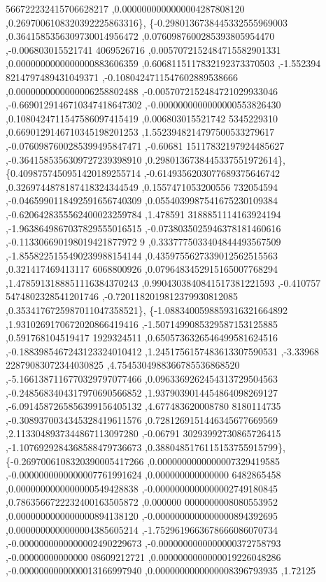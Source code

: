 \begin{DoxyCode}
      566722232415706628217 ,0.0000000000000004287808120 ,0.2697006108320392225863316\},
\{-0.2980136738445332555969003 ,0.3641585356309730014956472 ,0.0760987600285393805954470 ,-0.006803015521741
      4069526716 ,0.0057072152484715582901331 ,0.0000000000000000883606359 ,0.6068115117832192373370503 ,-1.552394
      8214797489431049371 ,-0.1080424711547602889538666 ,0.0000000000000006258802488 ,-0.0057072152484721029933046
       ,-0.6690129146710347418647302 ,-0.0000000000000000553826430 ,0.1080424711547586097415419 ,0.006803015521742
      5345229310 ,0.6690129146710345198201253 ,1.5523948214797500533279617 ,-0.0760987600285399495847471 ,-0.60681
      15117832197924485627 ,-0.3641585356309727239398910 ,0.2980136738445337551972614\},
\{0.4098757450951420189255714 ,-0.6149356203077689375646742 ,0.3269744878187418324344549 ,0.1557471053200556
      732054594 ,-0.0465990118492591656740309 ,0.0554039987541675230109384 ,-0.6206428355562400023259784 ,1.478591
      3188851114163924194 ,-1.9638649867037829555016515 ,-0.0738035025946378181460616 ,-0.113306690198019421877972
      9 ,0.3337775033404844493567509 ,-1.8558225155490239988154144 ,0.4359755627339012562515563 ,0.321417469413117
      6068800926 ,0.0796483452915165007768294 ,1.4785913188851116384370243 ,0.9904303840841517381221593 ,-0.410757
      5474802328541201746 ,-0.7201182019812379930812085 ,0.3534176725987011047358521\},
\{-1.0883400598859316321664892 ,1.9310269170672020866419416 ,-1.5071499085329587153125885 ,0.591768104519417
      1929324511 ,0.6505736326546499581624516 ,-0.1883985467243123324010412 ,1.2451756157483613307590531 ,-3.33968
      22879083072344030825 ,4.7545304988366785536868520 ,-5.1661387116770329797077466 ,0.0963369262454313729504563
       ,-0.2485683404317970690566852 ,1.9379039014454864098269127 ,-6.0914587265856399156405132 ,4.677483620008780
      8180114735 ,-0.3089370034345328419611576 ,0.7281269151446345677669569 ,2.1133048937344867113097280 ,-0.06791
      30293992730865726415 ,-1.1076929284368588479736673 ,0.3880485176115153755915799\},
\{-0.2697006108320390005417266 ,0.0000000000000007329419585 ,-0.0000000000000007761991624 ,0.000000000000000
      6482865458 ,0.0000000000000000549428838 ,-0.0000000000000002749180845 ,0.7863566722232400163505872 ,0.000000
      0000000008080553952 ,0.0000000000000000894138120 ,-0.0000000000000000894392695 ,0.0000000000000004385605214 
      ,-1.7529619663678666086070734 ,-0.0000000000000002490229673 ,-0.0000000000000000372758793 ,-0.00000000000000
      08609212721 ,0.0000000000000019226048286 ,-0.0000000000000013166997940 ,0.0000000000000008396793935 ,1.72125

\end{DoxyCode}
